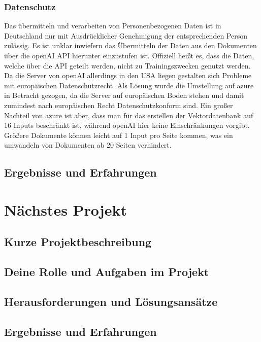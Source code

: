\subsubsection{Datenschutz}
Das übermitteln und verarbeiten von Personenbezogenen Daten ist in Deutschland nur mit Ausdrücklicher Genehmigung der entsprechenden Person zulässig. Es ist unklar inwiefern das Übermitteln der Daten aus den Dokumenten über die openAI API hierunter einzustufen ist. Offiziell heißt es, dass die Daten, welche über die API geteilt werden, nicht zu Trainingszwecken genutzt werden. Da die Server von openAI allerdings in den USA liegen gestalten sich Probleme mit europäischen Datenschutzrecht. Als Lösung wurde die Umstellung auf azure in Betracht gezogen, da die Server auf europäischen Boden stehen und damit zumindest nach europäischen Recht Datenschutzkonform sind. Ein großer Nachteil von azure ist aber, dass man für das erstellen der Vektordatenbank auf 16 Inputs beschränkt ist, während openAI hier keine Einschränkungen vorgibt. Größere Dokumente können leicht auf 1 Input pro Seite kommen, was ein umwandeln von Dokumenten ab 20 Seiten verhindert.



\subsection{Ergebnisse und Erfahrungen}

\section{Nächstes Projekt}

\subsection{Kurze Projektbeschreibung}
\subsection{Deine Rolle und Aufgaben im Projekt}
\subsection{Herausforderungen und Lösungsansätze}
\subsection{Ergebnisse und Erfahrungen}